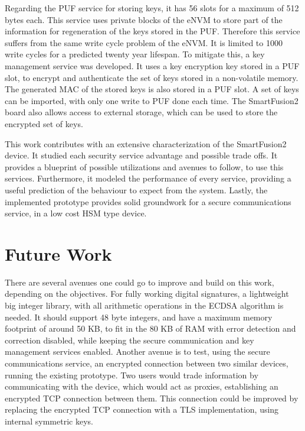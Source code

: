 Regarding the PUF service for storing keys, it has 56 slots for a maximum of 512 bytes each. This service uses private blocks of the eNVM to store part of the information for regeneration of the keys stored in the PUF. Therefore this service suffers from the same write cycle problem of the eNVM. It is limited to 1000 write cycles for a predicted twenty year lifespan. To mitigate this, a key management service was developed. It uses a key encryption key stored in a PUF slot, to encrypt and authenticate the set of keys stored in a non-volatile memory. The generated MAC of the stored keys is also stored in a PUF slot. A set of keys can be imported, with only one write to PUF done each time. The SmartFusion2 board also allows access to external storage, which can be used to store the encrypted set of keys.

This work contributes with an extensive characterization of the SmartFusion2 device. It studied each security service advantage and possible trade offs. It provides a blueprint of possible utilizations and avenues to follow, to use this services. Furthermore, it modeled the performance of every service, providing a useful prediction of the behaviour to expect from the system. Lastly, the implemented prototype provides solid groundwork for a secure communications service, in a low cost HSM type device.

\section{Future Work} \label{chap:conclusion:future-work}

There are several avenues one could go to improve and build on this work, depending on the objectives. For fully working digital signatures, a lightweight big integer library, with all arithmetic operations in the \ac{ECDSA} algorithm is needed. It should support 48 byte integers, and have a maximum memory footprint of around 50 KB, to fit in the 80 KB of RAM with error detection and correction disabled, while keeping the secure communication and key management services enabled.
Another avenue is to test, using the secure communications service, an encrypted connection between two similar devices, running the existing prototype. Two users would trade information by communicating with the device, which would act as proxies, establishing an encrypted TCP connection between them. This connection could be improved by replacing the encrypted TCP connection with a TLS implementation, using internal symmetric keys.
